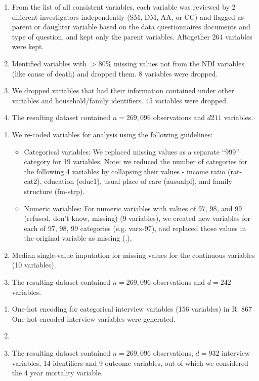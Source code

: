 \documentclass[reqno,11pt]{article}
\begin{document}
\begin{enumerate}
\item From the list of all consistent variables, each variable was reviewed by 2 different investigators independently (SM, DM, AA, or CC) and flagged as parent or daughter variable based on the data questionnaires documents and type of question, and kept only the parent variables. Altogether 264 variables were kept.
\item Identified variables with $>80$\% missing values not from the NDI variables (like cause of death) and dropped them. 8 variables were dropped.
\item We dropped variables that had their information contained under other variables and household/family identifiers. 45 variables were dropped.
\item  The resulting dataset contained $n=269,096$ observations and $d211$ variables.
\end{enumerate}

\begin{enumerate}
\item We re-coded variables for analysis using the following guidelines:
	\begin{itemize}
	\item Categorical variables: We replaced missing values as a separate “999” category for 19 variables. Note: we reduced the number of categories for the following 4 variables by collapsing their values - income ratio (rat-cat2), education (educ1), usual place of care (ausualpl), and family structure (fm-strp).
	\item Numeric  variables: 	For numeric variables with values of 97, 98, and 99 (refused, don’t know, missing) (9 variables), we created new variables for each of 97, 98, 99 categories (e.g. varx-97), and replaced those values in the original variable as missing (.). 
	\end{itemize}
\item Median single-value imputation for missing values for the continuous variables (10 variables).
\item The resulting dataset contained $n=269,096$ observations and $d=242$ variables.
\end{enumerate}

\begin{enumerate}
\item One-hot encoding for categorical interview variables (156 variables) in R. 867 One-hot encoded interview variables were generated.
\item \item The resulting dataset contained $n=269,096$ observations, $d=932$ interview variables, 14 identifiers and 9 outcome variables, out of which we considered the 4 year mortality variable.
\end{enumerate}
\end{document}
